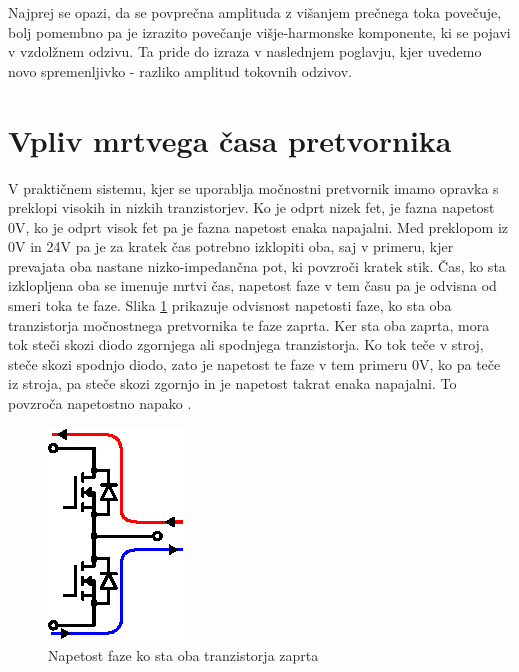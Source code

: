 \documentclass[a4paper,twoside,openright,12pt,slovene]{book}
\begin{document}
Najprej se opazi, da se povprečna amplituda z višanjem prečnega toka povečuje, bolj pomembno pa je izrazito povečanje višje-harmonske komponente, ki se pojavi v vzdolžnem odzivu. Ta pride do izraza v
naslednjem poglavju, kjer uvedemo novo spremenljivko - razliko amplitud tokovnih odzivov.

\section{Vpliv mrtvega časa pretvornika}

V praktičnem sistemu, kjer se uporablja močnostni pretvornik imamo opravka s preklopi visokih in nizkih tranzistorjev. Ko je odprt nizek fet, je fazna napetost 0V, ko je odprt visok fet pa je fazna
napetost enaka napajalni. Med preklopom iz 0V in 24V pa je za kratek čas potrebno izklopiti oba, saj v primeru, kjer prevajata oba nastane nizko-impedančna pot, ki povzroči kratek stik. Čas, ko sta
izklopljena oba se imenuje mrtvi čas, napetost faze v tem času pa je odvisna od smeri toka te faze. Slika \ref{mrtviCasRazlaga} prikazuje odvisnost napetosti faze, ko sta oba tranzistorja močnostnega
pretvornika te faze zaprta. Ker sta oba zaprta, mora tok steči skozi diodo zgornjega ali spodnjega tranzistorja. Ko tok teče v stroj, steče skozi spodnjo diodo, zato je napetost te faze v tem primeru
0V, ko pa teče iz stroja, pa steče skozi zgornjo in je napetost takrat enaka napajalni. To povzroča napetostno napako \cite{ambrovzivc2016elektrivcni}.

\begin{figure}[!htbp]
    \centering
    \includegraphics[width=0.4\columnwidth]{Slike/Inkscape/mrtviCasRazlaga.eps}
    \caption{\label{mrtviCasRazlaga} Napetost faze ko sta oba tranzistorja zaprta}
\end{figure}
\end{document}
